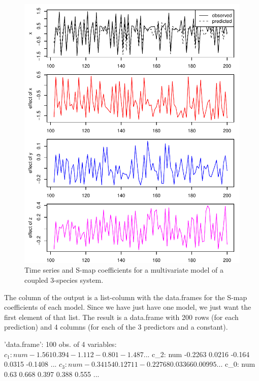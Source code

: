 \documentclass[article]{jss}
\begin{document}
\begin{figure}[t!]
\centering
\includegraphics[width=5in]{article-smap-coefficients}
\caption{\label{fig:smap-coefficients} Time series and S-map coefficients for a multivariate model of a coupled 3-species system.}
\end{figure}

The  column of the output is a list-column with the data.frames for the S-map coefficients of each model. Since we have just have one model, we just want the first element of that list. The result is a data.frame with 200 rows (for each prediction) and 4 columns (for each of the 3 predictors and a constant).

\begin{Schunk}
\begin{Soutput}
'data.frame':	100 obs. of  4 variables:
 $ c_1: num  -1.561 0.394 -1.112 -0.801 -1.487 ...
 $ c_2: num  -0.2263 0.0216 -0.164 0.0315 -0.1408 ...
 $ c_3: num  -0.34154 0.12711 -0.22768 0.03366 0.00995 ...
 $ c_0: num  0.63 0.668 0.397 0.388 0.555 ...
\end{Soutput}
\end{Schunk}
\end{document}
